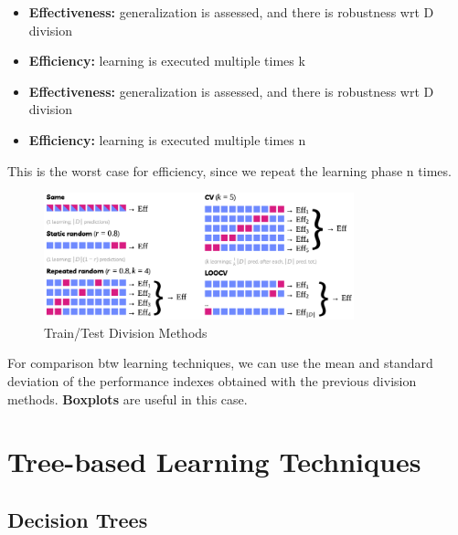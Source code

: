 \begin{definitionblock}
    \begin{itemize}
        \item \textbf{Effectiveness:} generalization is assessed, and there is robustness wrt D division 
        \item \textbf{Efficiency:} learning is executed multiple times \propto k
    \end{itemize}
\end{definitionblock}

\begin{definitionblock}
    \begin{itemize}
        \item \textbf{Effectiveness:} generalization is assessed, and there is robustness wrt D division 
        \item \textbf{Efficiency:} learning is executed multiple times \propto n 
    \end{itemize}
    This is the worst case for efficiency, since we repeat the learning phase n times.
\end{definitionblock}

\begin{figure}[H]
    \centering
    \includegraphics[width=0.8\textwidth]{assets/fig10.png}
    \caption{Train/Test Division Methods}
\end{figure}

For comparison btw learning techniques, we can use the mean and standard deviation of the performance indexes obtained with the previous division methods. \textbf{Boxplots} are useful in this case.

\section{Tree-based Learning Techniques}

\subsection{Decision Trees}

